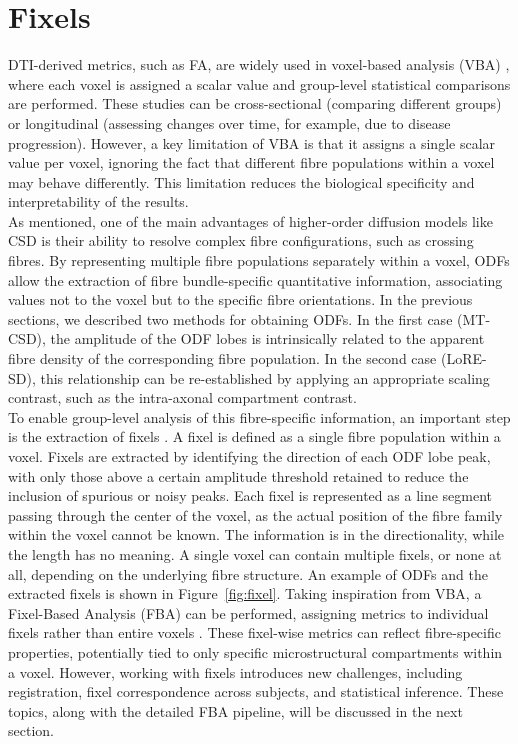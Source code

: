 \section{Fixels}

DTI-derived metrics, such as FA, are widely used in voxel-based analysis (VBA) \cite{Liu2009}, where each voxel is assigned a scalar value and group-level statistical comparisons are performed. These studies can be cross-sectional (comparing different groups) or longitudinal (assessing changes over time, for example, due to disease progression). However, a key limitation of VBA is that it assigns a single scalar value per voxel, ignoring the fact that different fibre populations within a voxel may behave differently. This limitation reduces the biological specificity and interpretability of the results.
\\As mentioned, one of the main advantages of higher-order diffusion models like CSD is their ability to resolve complex fibre configurations, such as crossing fibres. By representing multiple fibre populations separately within a voxel, ODFs allow the extraction of fibre bundle-specific quantitative information, associating values not to the voxel but to the specific fibre orientations. In the previous sections, we described two methods for obtaining ODFs. In the first case (MT-CSD), the amplitude of the ODF lobes is intrinsically related to the apparent fibre density of the corresponding fibre population. In the second case (LoRE-SD), this relationship can be re-established by applying an appropriate scaling contrast, such as the intra-axonal compartment contrast.
\\To enable group-level analysis of this fibre-specific information, an important step is the extraction of fixels \cite{Raffelt2017}. A fixel is defined as a single fibre population within a voxel. Fixels are extracted by identifying the direction of each ODF lobe peak, with only those above a certain amplitude threshold retained to reduce the inclusion of spurious or noisy peaks. Each fixel is represented as a line segment passing through the center of the voxel, as the actual position of the fibre family within the voxel cannot be known. The information is in the directionality, while the length has no meaning. A single voxel can contain multiple fixels, or none at all, depending on the underlying fibre structure. An example of ODFs and the extracted fixels is shown in Figure~\ref{fig:fixel}. Taking inspiration from VBA, a Fixel-Based Analysis (FBA) can be performed, assigning metrics to individual fixels rather than entire voxels \cite{Dhollander2021}. These fixel-wise metrics can reflect fibre-specific properties, potentially tied to only specific microstructural compartments within a voxel. However, working with fixels introduces new challenges, including registration, fixel correspondence across subjects, and statistical inference. These topics, along with the detailed FBA pipeline, will be discussed in the next section.

